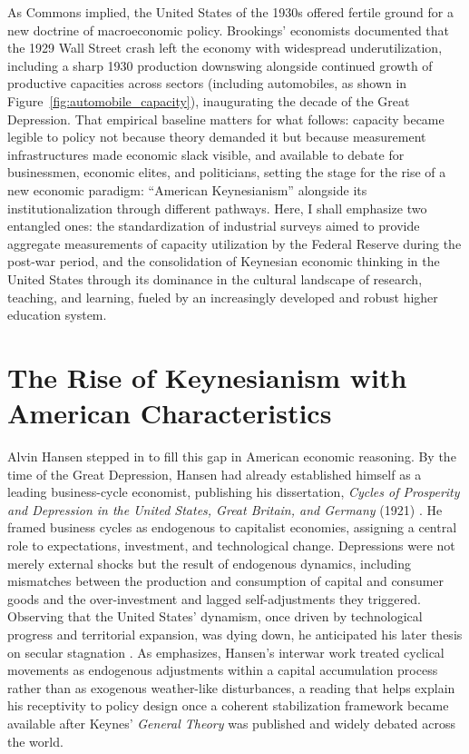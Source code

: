 \documentclass[11pt]{article}
\begin{document}
As Commons implied, the United States of the 1930s offered fertile ground for a new doctrine of macroeconomic policy. Brookings' economists documented that the 1929 Wall Street crash left the economy with widespread underutilization, including a sharp 1930 production downswing alongside continued growth of productive capacities across sectors (including automobiles, as shown in Figure~\ref{fig:automobile_capacity}), inaugurating the decade of the Great Depression. That empirical baseline matters for what follows: capacity became legible to policy not because theory demanded it but because measurement infrastructures made economic slack visible, and available to debate for businessmen, economic elites, and politicians, setting the stage for the rise of a new economic paradigm: ``American Keynesianism'' alongside its institutionalization through different pathways. Here, I shall emphasize two entangled ones: the standardization of industrial surveys aimed to provide aggregate measurements of capacity utilization by the Federal Reserve during the post-war period, and the consolidation of Keynesian economic thinking in the United States through its dominance in the cultural landscape of research, teaching, and learning, fueled by an increasingly developed and robust higher education system.

\section{The Rise of Keynesianism with American Characteristics}

Alvin Hansen stepped in to fill this gap in American economic reasoning. By the time of the Great Depression, Hansen had already established himself as a leading business-cycle economist, publishing his dissertation, \emph{Cycles of Prosperity and Depression in the United States, Great Britain, and Germany} (1921) \citep{hansen1921}. He framed business cycles as endogenous to capitalist economies, assigning a central role to expectations, investment, and technological change. Depressions were not merely external shocks but the result of endogenous dynamics, including mismatches between the production and consumption of capital and consumer goods and the over-investment and lagged self-adjustments they triggered. Observing that the United States' dynamism, once driven by technological progress and territorial expansion, was dying down, he anticipated his later thesis on secular stagnation \citep{hansen1938}. As \citet{barber1987} emphasizes, Hansen's interwar work treated cyclical movements as endogenous adjustments within a capital accumulation process rather than as exogenous weather-like disturbances, a reading that helps explain his receptivity to policy design once a coherent stabilization framework became available after Keynes' \emph{General Theory} was published and widely debated across the world.
\end{document}

